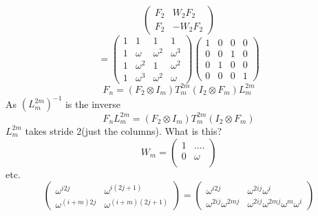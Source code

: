 \documentclass{article}
\begin{document}
	\begin{equation}
		\begin{pmatrix}
			F_2 & W_2F_2 \\
			F_2 & -W_2F_2
		\end{pmatrix}
	\end{equation}
	\begin{equation}
		=\begin{pmatrix}
			1 & 1 & 1 & 1 \\
			1 & \omega & \omega^2 & \omega^3 \\
			1 & \omega^2 & 1 & \omega^2 \\
			1 & \omega^3 & \omega^2 & \omega
		\end{pmatrix}
		\begin{pmatrix}
			1 & 0 & 0 & 0 \\
			0 & 0 & 1 & 0 \\
			0 & 1 & 0 & 0 \\
			0 & 0 & 0 & 1
		\end{pmatrix}
	\end{equation}
	\begin{equation}
		F_n=(F_2 \otimes I_m)T_m^{2m}(I_2 \otimes F_m)L_m^{2m}
	\end{equation}
	As $(L_m^{2m})^{-1}$ is the inverse
	\begin{equation}
		F_nL_m^{2m}=(F_2 \otimes I_m)T_m^{2m}(I_2 \otimes F_m)
	\end{equation}
	$L_m^{2m}$ takes stride 2(just the columns). What is this?
	\begin{equation}
		W_m = \begin{pmatrix}
			1 & .... \\
			0 & \omega \\
		\end{pmatrix}
	\end{equation}
etc.
	\begin{equation}
		\begin{pmatrix}
			\omega^{i2j} & \omega^{i(2j+1)} \\
			\omega^{(i+m)2j} & \omega^{(i+m)(2j+1)}
		\end{pmatrix}
		=
		\begin{pmatrix}
			\omega^{i2j} & \omega^{2ij}\omega^i \\
			\omega^{2ij}\omega^{2mj} & \omega^{2ij}\omega^{2mj}\omega^{m}\omega^i
		\end{pmatrix}
	\end{equation}
\end{document}
